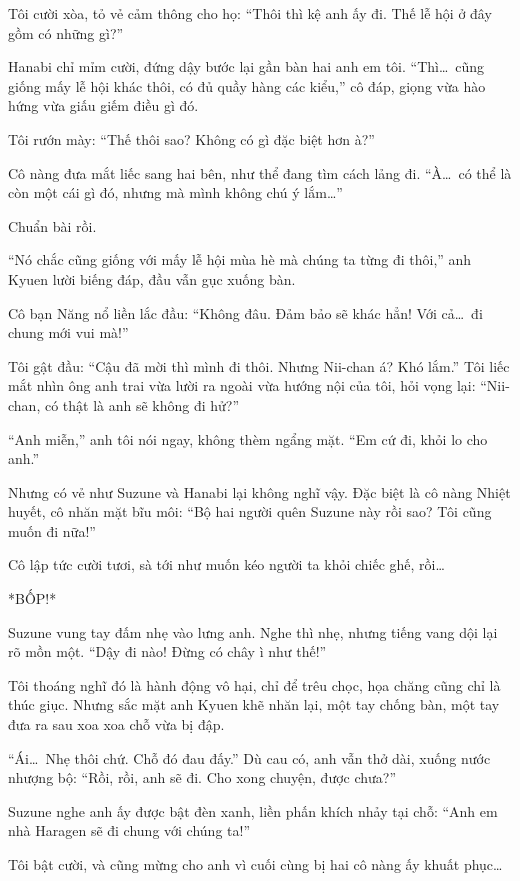 \documentclass[../main.tex]{subfiles}
\begin{document}
Tôi cười xòa, tỏ vẻ cảm thông cho họ: ``Thôi thì kệ anh ấy đi. Thế lễ hội ở đây gồm có những gì?''

Hanabi chỉ mỉm cười, đứng dậy bước lại gần bàn hai anh em tôi. ``Thì\dots\ cũng giống mấy lễ hội khác thôi, có đủ quầy hàng các kiểu,'' cô đáp, giọng vừa hào hứng vừa giấu giếm điều gì đó.

Tôi rướn mày: ``Thế thôi sao? Không có gì đặc biệt hơn à?''

Cô nàng đưa mắt liếc sang hai bên, như thể đang tìm cách lảng đi. ``À\dots\ có thể là còn một cái gì đó, nhưng mà mình không chú ý lắm\dots''

Chuẩn bài rồi.

``Nó chắc cũng giống với mấy lễ hội mùa hè mà chúng ta từng đi thôi,'' anh Kyuen lười biếng đáp, đầu vẫn gục xuống bàn.

Cô bạn Năng nổ liền lắc đầu: ``Không đâu. Đảm bảo sẽ khác hẳn! Với cả\dots\ đi chung mới vui mà!''

Tôi gật đầu: ``Cậu đã mời thì mình đi thôi. Nhưng Nii-chan á? Khó lắm.'' Tôi liếc mắt nhìn ông anh trai vừa lười ra ngoài vừa hướng nội của tôi, hỏi vọng lại: ``Nii-chan, có thật là anh sẽ không đi hử?''

``Anh miễn,'' anh tôi nói ngay, không thèm ngẩng mặt. ``Em cứ đi, khỏi lo cho anh.''

Nhưng có vẻ như Suzune và Hanabi lại không nghĩ vậy. Đặc biệt là cô nàng Nhiệt huyết, cô nhăn mặt bĩu môi: ``Bộ hai người quên Suzune này rồi sao? Tôi cũng muốn đi nữa!''

Cô lập tức cười tươi, sà tới như muốn kéo người ta khỏi chiếc ghế, rồi\dots

*BỐP!*

Suzune vung tay đấm nhẹ vào lưng anh. Nghe thì nhẹ, nhưng tiếng vang dội lại rõ mồn một. ``Dậy đi nào! Đừng có chây ì như thế!''

Tôi thoáng nghĩ đó là hành động vô hại, chỉ để trêu chọc, họa chăng cũng chỉ là thúc giục. Nhưng sắc mặt anh Kyuen khẽ nhăn lại, một tay chống bàn, một tay đưa ra sau xoa xoa chỗ vừa bị đập.

``Ái\dots\ Nhẹ thôi chứ. Chỗ đó đau đấy.'' Dù cau có, anh vẫn thở dài, xuống nước nhượng bộ: ``Rồi, rồi, anh sẽ đi. Cho xong chuyện, được chưa?''

Suzune nghe anh ấy được bật đèn xanh, liền phấn khích nhảy tại chỗ: ``Anh em nhà Haragen sẽ đi chung với chúng ta!''

Tôi bật cười, và cũng mừng cho anh vì cuối cùng bị hai cô nàng ấy khuất phục\dots
\end{document}
